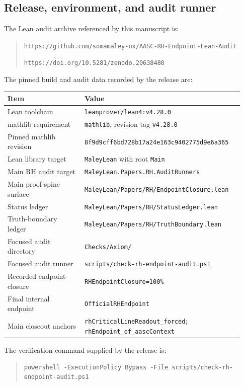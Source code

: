 \documentclass[11pt]{article}
\begin{document}
\subsection{Release, environment, and audit runner}

The Lean audit archive referenced by this manuscript is:
\begin{quote}\footnotesize
\texttt{https://github.com/somamaley-ux/AASC-RH-Endpoint-Lean-Audit}\par
\texttt{https://doi.org/10.5281/zenodo.20638480}
\end{quote}

The pinned build and audit data recorded by the release are:
\begin{longtable}{@{}L{0.31\linewidth}L{0.62\linewidth}@{}}
\toprule
Item & Value \\
\midrule
Lean toolchain & \texttt{leanprover/lean4:v4.28.0} \\
mathlib requirement & \texttt{mathlib}, revision tag \texttt{v4.28.0} \\
Pinned mathlib revision & \texttt{8f9d9cff6bd728b17a24e163c9402775d9e6a365} \\
Lean library target & \texttt{MaleyLean} with root \texttt{Main} \\
Main RH audit target & \texttt{MaleyLean.Papers.RH.AuditRunners} \\
Main proof-spine surface & \texttt{MaleyLean/Papers/RH/EndpointClosure.lean} \\
Status ledger & \texttt{MaleyLean/Papers/RH/StatusLedger.lean} \\
Truth-boundary ledger & \texttt{MaleyLean/Papers/RH/TruthBoundary.lean} \\
Focused audit directory & \texttt{Checks/Axiom/} \\
Focused audit runner & \texttt{scripts/check-rh-endpoint-audit.ps1} \\
Recorded endpoint closure & \texttt{RHEndpointClosure=100\%} \\
Final internal endpoint & \texttt{OfficialRHEndpoint} \\
Main closeout anchors & \texttt{rhCriticalLineReadout\_forced}; \texttt{rhEndpoint\_of\_aascContext} \\
\bottomrule
\end{longtable}

The verification command supplied by the release is:
\begin{quote}\footnotesize\begin{verbatim}
powershell -ExecutionPolicy Bypass -File scripts/check-rh-endpoint-audit.ps1
\end{verbatim}\end{quote}
\end{document}
